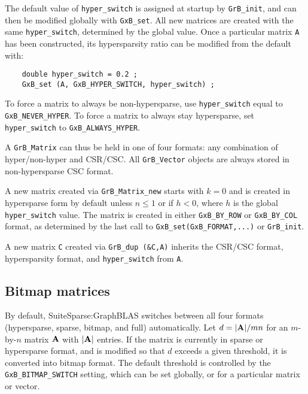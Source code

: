\documentclass[12pt]{article}
\begin{document}
{The default value of \verb'hyper_switch' is assigned at startup by
\verb'GrB_init', and can then be modified globally with \verb'GxB_set'.  All
new matrices are created with the same \verb'hyper_switch', determined by the
global value.  Once a particular matrix \verb'A' has been constructed, its
hypersparsity ratio can be modified from the default with:

    {\footnotesize
    \begin{verbatim}
    double hyper_switch = 0.2 ;
    GxB_set (A, GxB_HYPER_SWITCH, hyper_switch) ; \end{verbatim}}

To force a matrix to always be non-hypersparse, use \verb'hyper_switch' equal to
\verb'GxB_NEVER_HYPER'.  To force a matrix to always stay hypersparse, set
\verb'hyper_switch' to \verb'GxB_ALWAYS_HYPER'.

A \verb'GrB_Matrix' can thus be held in one of four formats: any combination of
hyper/non-hyper and CSR/CSC.  All \verb'GrB_Vector' objects are always stored
in non-hypersparse CSC format.

A new matrix created via \verb'GrB_Matrix_new' starts with $k=0$ and is created
in hypersparse form by default unless $n \le 1$ or if $h<0$, where $h$ is the
global \verb'hyper_switch' value.  The matrix is created in either
\verb'GxB_BY_ROW' or \verb'GxB_BY_COL' format, as determined by the last call
to \verb'GxB_set(GxB_FORMAT,...)' or \verb'GrB_init'.

A new matrix \verb'C' created via \verb'GrB_dup (&C,A)' inherits the CSR/CSC
format, hypersparsity format, and \verb'hyper_switch' from \verb'A'.

\subsection{Bitmap matrices}
\label{bitmap_switch}

By default, SuiteSparse:GraphBLAS switches between all four formats
(hypersparse, sparse, bitmap, and full) automatically.  Let $d = |{\bf A}|/mn$
for an $m$-by-$n$ matrix $\bf A$ with $|{\bf A}|$ entries.  If the matrix is
currently in sparse or hypersparse format, and is modified so that $d$ exceeds
a given threshold, it is converted into bitmap format.  The default threshold
is controlled by the \verb'GxB_BITMAP_SWITCH' setting, which can be set
globally, or for a particular matrix or vector.

}
\end{document}
